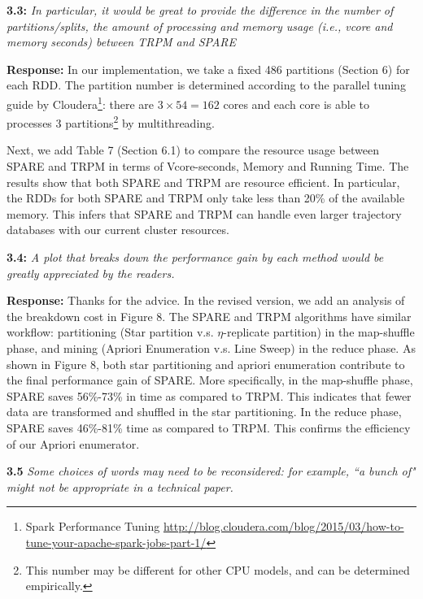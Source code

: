 \documentclass{vldb}
\begin{document}
\textbf{3.3:} \emph{In particular, it would be great to provide the
difference in the number of partitions/splits, the amount of processing and
memory usage (i.e., vcore and memory seconds) between TRPM and SPARE}

\textbf{Response:} In our implementation, we take a fixed 486 partitions (Section 6)
for each RDD. The partition number is determined according to
the parallel tuning guide by Cloudera\footnote{Spark Performance Tuning \url{http://blog.cloudera.com/blog/2015/03/how-to-tune-your-apache-spark-jobs-part-1/}}: there are  $3\times 54=162$ cores and each core is able to processes 3 partitions\footnote{This number may be different for other CPU models, and can be determined empirically.}
by multithreading.

Next, we add Table 7 (Section 6.1) to compare the resource usage between SPARE and TRPM in terms of Vcore-seconds, Memory and Running Time. The results show that both SPARE and TRPM are resource efficient. In particular, the RDDs for both SPARE and TRPM only take less than 20\% of the available memory. This infers that SPARE and TRPM can handle
even larger trajectory databases with our current cluster resources.



\textbf{3.4:} \emph{A plot that breaks down the performance gain by each method would
be greatly appreciated by the readers.}

\textbf{Response:} Thanks for the advice. In the revised version, we add an analysis of
the breakdown cost in Figure 8. The SPARE and TRPM algorithms have similar workflow: partitioning (Star partition v.s. $\eta$-replicate partition) in the map-shuffle phase, and  mining (Apriori Enumeration v.s. Line Sweep) in the reduce phase. %
As shown in Figure 8,
both star partitioning and apriori enumeration contribute to 
the final performance gain of SPARE. More specifically, in the map-shuffle phase,
SPARE saves 56\%-73\% in time as compared to TRPM. This indicates that 
fewer data are transformed and shuffled in the star partitioning.
In the reduce phase, SPARE saves 46\%-81\% time as compared to TRPM. This confirms 
the efficiency of our Apriori enumerator.



\textbf{3.5} \emph{Some choices of words may need to be reconsidered: for example, ``a bunch
of" might not be appropriate in a technical paper.}
\end{document}
